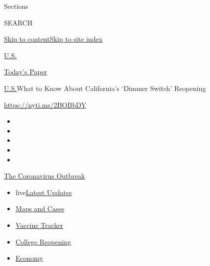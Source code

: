 Sections

SEARCH

\protect\hyperlink{site-content}{Skip to
content}\protect\hyperlink{site-index}{Skip to site index}

\href{https://www.nytimes3xbfgragh.onion/section/us}{U.S.}

\href{https://myaccount.nytimes3xbfgragh.onion/auth/login?response_type=cookie\&client_id=vi}{}

\href{https://www.nytimes3xbfgragh.onion/section/todayspaper}{Today's
Paper}

\href{/section/us}{U.S.}\textbar{}What to Know About California's
`Dimmer Switch' Reopening

\url{https://nyti.ms/2BOBbDY}

\begin{itemize}
\item
\item
\item
\item
\item
\end{itemize}

\href{https://www.nytimes3xbfgragh.onion/news-event/coronavirus?action=click\&pgtype=Article\&state=default\&region=TOP_BANNER\&context=storylines_menu}{The
Coronavirus Outbreak}

\begin{itemize}
\tightlist
\item
  live\href{https://www.nytimes3xbfgragh.onion/2020/08/04/world/coronavirus-cases.html?action=click\&pgtype=Article\&state=default\&region=TOP_BANNER\&context=storylines_menu}{Latest
  Updates}
\item
  \href{https://www.nytimes3xbfgragh.onion/interactive/2020/us/coronavirus-us-cases.html?action=click\&pgtype=Article\&state=default\&region=TOP_BANNER\&context=storylines_menu}{Maps
  and Cases}
\item
  \href{https://www.nytimes3xbfgragh.onion/interactive/2020/science/coronavirus-vaccine-tracker.html?action=click\&pgtype=Article\&state=default\&region=TOP_BANNER\&context=storylines_menu}{Vaccine
  Tracker}
\item
  \href{https://www.nytimes3xbfgragh.onion/2020/08/02/us/covid-college-reopening.html?action=click\&pgtype=Article\&state=default\&region=TOP_BANNER\&context=storylines_menu}{College
  Reopening}
\item
  \href{https://www.nytimes3xbfgragh.onion/live/2020/08/04/business/stock-market-today-coronavirus?action=click\&pgtype=Article\&state=default\&region=TOP_BANNER\&context=storylines_menu}{Economy}
\end{itemize}

